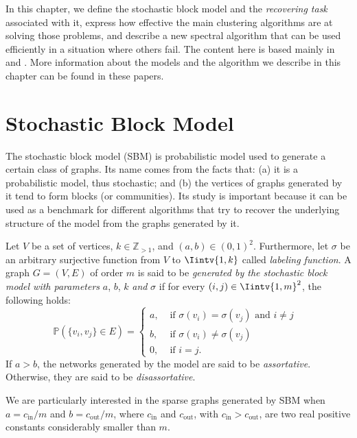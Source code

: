 In this chapter, we define the stochastic block model and the \textit{recovering task} associated with it, express how effective the main clustering algorithms are at solving those problems, and describe a new spectral algorithm that can be used efficiently in a situation where others fail.
The content here is based mainly in \cite{bethe} and \cite{bethe2}.
More information about the models and the algorithm we describe in this chapter can be found in these papers.


\section{Stochastic Block Model}
The stochastic block model (SBM) is probabilistic model used to generate a certain class of graphs.
Its name comes from the facts that: (a) it is a probabilistic model, thus stochastic; and (b) the vertices of graphs generated by it tend to form blocks (or communities).
Its study is important because it can be used as a benchmark for different algorithms that try to recover the underlying structure of the model from the graphs generated by it.

\begin{definition}
   Let $V$ be a set of vertices, $k \in \mathbb Z_{>1}$, and $(a,b) \in (0,1)^2$.
   Furthermore, let $\sigma$ be an arbitrary surjective function from $V$ to $\Iintv{1,k}$ called \textit{labeling function}.
   A graph $G=(V,E)$ of order $m$ is said to be \textit{generated by the stochastic block model with parameters} $a$, $b$, $k$ \textit{and} $\sigma$ if for every $(i,j) \in \Iintv{1,m}^2$, the following holds:
   \begin{equation}
      \mathbb P (\{v_i, v_j\} \in E) =
      \begin{cases}
         a, & \text{ if $\sigma (v_i) = \sigma (v_j)$ and $i \ne j$ } \\
         b, & \text{ if $\sigma (v_i) \ne \sigma (v_j)$ } \\
         0, & \text{ if $i = j$. }
      \end{cases}
   \end{equation}
   If $a > b$, the networks generated by the model are said to be \textit{assortative}. 
   Otherwise, they are said to be \textit{disassortative}. 
\end{definition}

\begin{remark}
   We are particularly interested in the sparse graphs generated by SBM when $a = c_{\text{in}}/m$ and $b = c_{\text{out}}/m$, where $c_\text{in}$ and $c_\text{out}$, with $c_\text{in} > c_\text{out}$, are two real positive constants considerably smaller than $m$. 
\end{remark}

